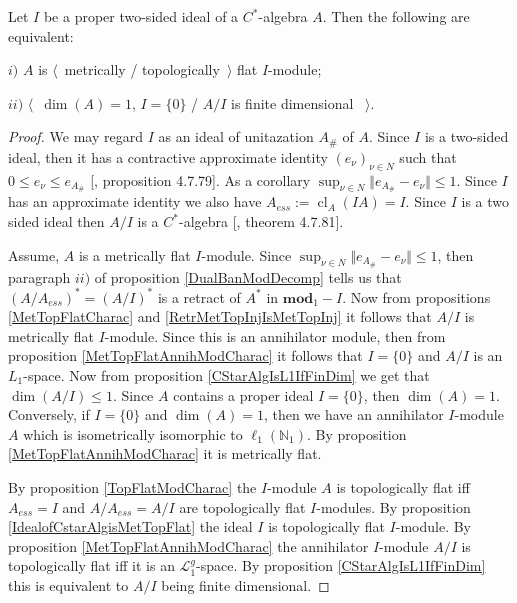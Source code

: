 \begin{proposition}\label{CStarAlgIsTopFlatOverItsIdeal} Let $I$ be a proper two-sided ideal of a  $C^*$-algebra $A$. Then the following are equivalent:

$i)$ $A$ is $\langle$~metrically / topologically~$\rangle$ flat $I$-module;

$ii)$ $\langle$~$\operatorname{dim}(A)=1$, $I=\{0\}$ / $A/I$ is finite dimensional ~$\rangle$.

\end{proposition}
\begin{proof} We may regard $I$ as an  ideal of unitazation $A_\#$ of $A$. Since $I$ is a two-sided ideal, then it has a contractive approximate identity $(e_\nu)_{\nu\in N}$ such that $0\leq e_\nu\leq e_{A_\#}$ [\cite{HelBanLocConvAlg}, proposition 4.7.79]. As a corollary $\sup_{\nu\in N}\Vert e_{A_\#}-e_\nu\Vert\leq 1$. Since $I$ has an approximate identity we also have $A_{ess}:=\operatorname{cl}_A(IA)=I$. Since $I$ is a two sided ideal then $A/I$ is a $C^*$-algebra [\cite{HelBanLocConvAlg}, theorem 4.7.81].

Assume, $A$ is a metrically flat $I$-module. Since $\sup_{\nu\in N}\Vert e_{A_\#}-e_\nu\Vert\leq 1$, then paragraph $ii)$ of proposition \ref{DualBanModDecomp} tells us that $(A/A_{ess})^*=(A/I)^*$ is a retract of $A^*$ in $\mathbf{mod}_1-I$. Now from propositions \ref{MetTopFlatCharac} and \ref{RetrMetTopInjIsMetTopInj} it follows that $A/I$ is metrically flat $I$-module. Since this is an annihilator module, then from proposition \ref{MetTopFlatAnnihModCharac} it follows that $I=\{0\}$ and $A/I$ is an $L_1$-space. Now from proposition \ref{CStarAlgIsL1IfFinDim} we get that $\operatorname{dim}(A/I)\leq 1$. Since $A$ contains a proper ideal $I=\{0\}$, then $\operatorname{dim}(A)=1$. Conversely, if $I=\{0\}$ and $\operatorname{dim}(A)=1$, then we have an annihilator $I$-module $A$ which is isometrically isomorphic to $\ell_1(\mathbb{N}_1)$. By proposition \ref{MetTopFlatAnnihModCharac} it is metrically flat. 

By proposition \ref{TopFlatModCharac} the $I$-module $A$ is topologically flat iff $A_{ess}=I$ and $A/A_{ess}=A/I$ are topologically flat $I$-modules. By proposition \ref{IdealofCstarAlgisMetTopFlat} the ideal $I$ is topologically flat $I$-module. By proposition \ref{MetTopFlatAnnihModCharac} the annihilator $I$-module $A/I$ is topologically flat iff it is an $\mathscr{L}_1^g$-space. By proposition \ref{CStarAlgIsL1IfFinDim} this is equivalent to $A/I$ being finite dimensional.
\end{proof}

